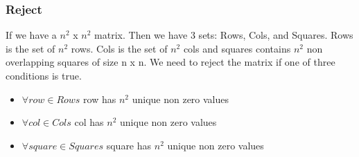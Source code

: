 \documentclass{sig-alternate}
\begin{document}
\subsubsection{Reject}
If we have a $n^2$ x $n^2$ matrix. Then we have 3 sets: Rows, Cols, and Squares. Rows is the set of $n^2$ rows. Cols is the set of $n^2$ cols and squares contains $n^2$ non overlapping squares of size n x n. We need to reject the matrix if one of three conditions is true. 
\begin{itemize}
\item{$\forall row \in Rows$ row has $n^2$ unique non zero values}
\item{$\forall col \in Cols$ col has $n^2$ unique non zero values}
\item{$\forall square \in Squares$ square has $n^2$ unique non zero values}
\end{itemize}
\end{document}
